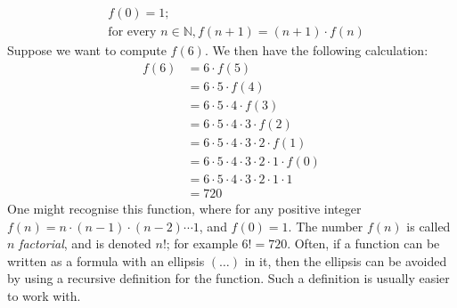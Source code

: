 \documentclass{report}
\theoremstyle{definition}
\begin{document}
\begin{align*}
&f(0)=1;\\
&\text{for every }n\in\mathbb N,f(n+1)=(n+1)\cdot f(n)
\end{align*}
Suppose we want to compute $f(6)$. We then have the following calculation:
\begin{align*}
f(6)&=6\cdot f(5)\\
&=6\cdot5\cdot f(4)\\
&=6\cdot5\cdot4\cdot f(3)\\
&=6\cdot5\cdot4\cdot3\cdot f(2)\\
&=6\cdot5\cdot4\cdot3\cdot2\cdot f(1)\\
&=6\cdot5\cdot4\cdot3\cdot2\cdot1\cdot f(0)\\
&=6\cdot5\cdot4\cdot3\cdot2\cdot1\cdot1\\
&=720
\end{align*}
One might recognise this function, where for any positive integer $f(n)=n\cdot(n-1)\cdot(n-2)\cdots1$, and $f(0)=1$. The number $f(n)$ is called $n$ \textit{factorial}, and is denoted $n!$; for 
example $6!=720$. Often, if a function can be written as a formula with an ellipsis $(\ldots)$ in it, then the ellipsis can be avoided by using a recursive definition for the function. 
Such a definition is usually easier to work with.
\newpage
\end{document}

